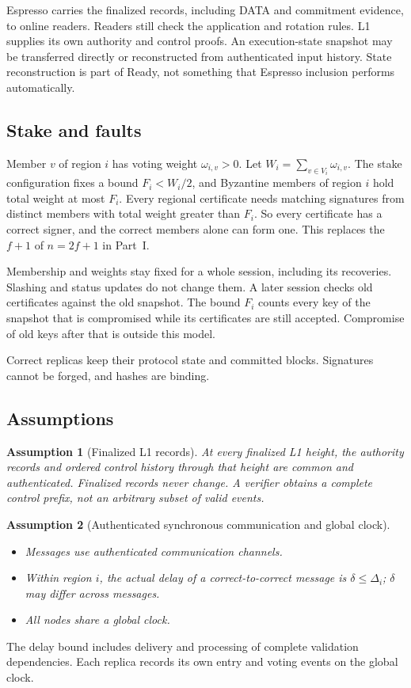 \documentclass[11pt,a4paper]{article}
\newtheorem{assumption}[assumption]{Assumption}
\newcounter{protocol}
\begin{document}
Espresso carries the finalized records, including DATA and commitment
evidence, to online readers. Readers still check the application and
rotation rules. L1 supplies its own authority and control proofs.
An execution-state snapshot may be transferred directly or reconstructed
from authenticated input history. State reconstruction is part of Ready,
not something that Espresso inclusion performs automatically.

\subsection{Stake and faults}
\label{sec:stake}
Member $v$ of region $i$ has voting weight $\omega_{i,v}>0$. Let
$W_i=\sum_{v\in V_i}\omega_{i,v}$. The stake configuration
fixes a bound $F_i<W_i/2$, and Byzantine members of region $i$ hold
total weight at most $F_i$. Every regional certificate needs
matching signatures from distinct members with total weight greater than
$F_i$. So every certificate has a correct signer, and the correct members
alone can form one. This replaces the $f+1$ of $n=2f+1$ in Part~I.

Membership and weights stay fixed for a whole session, including its
recoveries. Slashing and status updates do not change them. A later
session checks old certificates against the old snapshot. The bound
$F_i$ counts every key of the snapshot that is compromised while its
certificates are still accepted. Compromise of old keys after that is
outside this model.

Correct replicas keep their protocol state and committed blocks.
Signatures cannot be forged, and hashes are binding.



\subsection{Assumptions}
\label{sec:assumptions}
\begin{assumption}[Finalized L1 records]
\label{ass:authority}
At every finalized L1 height, the authority records and ordered control
history through that height are common and authenticated. Finalized
records never change. A verifier obtains a complete control prefix,
not an arbitrary subset of valid events.
\end{assumption}

\begin{assumption}[Authenticated synchronous communication and global clock]
\label{ass:network}
\leavevmode\par
\begin{itemize}
\item Messages use authenticated communication channels.
\item Within region $i$, the actual delay of a correct-to-correct
message is $\delta\le\Delta_i$; $\delta$ may differ across messages.
\item All nodes share a global clock.
\end{itemize}
\end{assumption}
The delay bound includes delivery and processing of complete validation
dependencies. Each replica records its own entry and voting events on
the global clock.
\end{document}
